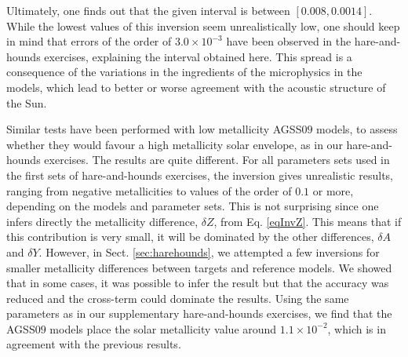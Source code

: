 \documentclass[a4paper,fleqn,usenatbib]{mnras}
\begin{document}
Ultimately, one finds out that the given interval is between $\left[ 0.008, 0.0014 \right]$. While the lowest values of this inversion seem unrealistically low, one should keep in mind that errors of the order of $3.0 \times 10^{-3}$ have been observed in the hare-and-hounds exercises, explaining the interval obtained here. This spread is a consequence of the variations in the ingredients of the microphysics in the models, which lead to better or worse agreement with the acoustic structure of the Sun.


Similar tests have been performed with low metallicity AGSS$09$ models, to assess whether they would favour a high metallicity solar envelope, as in our hare-and-hounds exercises. The results are quite different. For all parameters sets used in the first sets of hare-and-hounds exercises, the inversion gives unrealistic results, ranging from negative metallicities to values of the order of $0.1$ or more, depending on the models and parameter sets. This is not surprising since one infers directly the metallicity difference, $\delta Z$, from Eq. \ref{eqInvZ}. This means that if this contribution is very small, it will be dominated by the other differences, $\delta A$ and $\delta Y$. However, in Sect. \ref{sec:harehounds}, we attempted a few inversions for smaller metallicity differences between targets and reference models. We showed that in some cases, it was possible to infer the result but that the accuracy was reduced and the cross-term could dominate the results. Using the same parameters as in our supplementary hare-and-hounds exercises, we find that the AGSS$09$ models place the solar metallicity value around $1.1 \times 10^{-2}$, which is in agreement with the previous results. 
\end{document}
